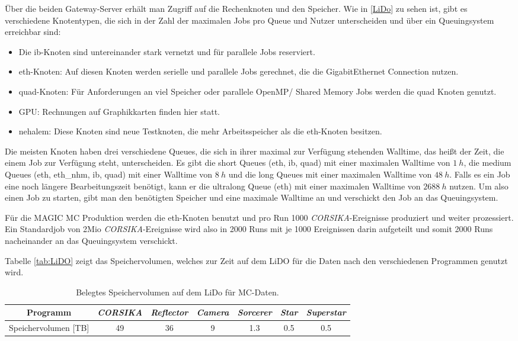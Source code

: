 Über die beiden Gateway-Server erhält man Zugriff auf die Rechenknoten und den Speicher.
Wie in \autoref{LiDo} zu sehen ist, gibt es verschiedene Knotentypen, die sich in der Zahl der maximalen Jobs pro Queue und Nutzer unterscheiden und über ein Queuingsystem erreichbar sind:

\begin{itemize}
 \item Die ib-Knoten sind untereinander stark vernetzt und für parallele Jobs reserviert.
 \item eth-Knoten: Auf diesen Knoten werden serielle und parallele Jobs gerechnet, die die GigabitEthernet Connection nutzen.
 \item quad-Knoten: Für Anforderungen an viel Speicher oder parallele OpenMP/ Shared Memory Jobs werden die quad Knoten genutzt.
 \item GPU: Rechnungen auf Graphikkarten finden hier statt.
 \item nehalem: Diese Knoten sind neue Testknoten, die mehr Arbeitsspeicher als die eth-Knoten besitzen.
\end{itemize}

Die meisten Knoten haben drei verschiedene Queues, die sich in ihrer maximal zur Verfügung stehenden Walltime, das heißt der Zeit, die einem Job zur Verfügung steht, unterscheiden.
Es gibt die short Queues (eth, ib, quad) mit einer maximalen Walltime von $\SI{1}{h}$, die medium Queues (eth, eth\_nhm, ib, quad) mit einer Walltime von $\SI{8}{h}$ und die long Queues mit einer maximalen Walltime von $\SI{48}{h}$. 
Falls es ein Job eine noch längere Bearbeitungszeit benötigt, kann er die ultralong Queue (eth) mit einer maximalen Walltime von $\SI{2688}{h}$ nutzen.
Um also einen Job zu starten, gibt man den benötigten Speicher und eine maximale Walltime an und verschickt den Job an das Queuingsystem.

Für die MAGIC MC Produktion werden die eth-Knoten benutzt und pro Run 1000 \textit{CORSIKA}-Ereignisse produziert und weiter prozessiert. 
Ein Standardjob von 2Mio \textit{CORSIKA}-Ereignisse wird also in 2000 Runs mit je 1000 Ereignissen darin aufgeteilt und somit 2000 Runs nacheinander an das Queuingsystem verschickt.


Tabelle \autoref{tab:LiDO} zeigt das Speichervolumen, welches zur Zeit auf dem LiDO für die Daten nach den verschiedenen Programmen genutzt wird.

\begin{table}[h!]
    \centering
    \caption{Belegtes Speichervolumen auf dem LiDo für MC-Daten.}
    \label{tab:LiDO}
    \begin{tabular}{ccccccc}
        \toprule
        Programm & \textit{CORSIKA} & \textit{Reflector} & \textit{Camera} & \textit{Sorcerer} & \textit{Star} & \textit{Superstar}\\
        \midrule
        Speichervolumen [TB] & 49 & 36 & 9 & 1.3 & 0.5 & 0.5\\
        \bottomrule
    \end{tabular}
\end{table}

